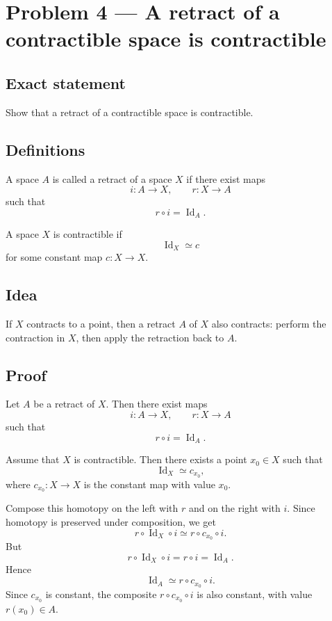 \documentclass[12pt,a4paper]{article}
\theoremstyle{notespace}
\begin{document}
\section{Problem 4 --- A retract of a contractible space is contractible}

\subsection{Exact statement}

Show that a retract of a contractible space is contractible.

\subsection{Definitions}

A space \(A\) is called a retract of a space \(X\) if there exist maps
\[
i:A\to X,
\qquad
r:X\to A
\]
such that
\[
r\circ i = \operatorname{Id}_A.
\]

A space \(X\) is contractible if
\[
\operatorname{Id}_X \simeq c
\]
for some constant map \(c:X\to X\).

\subsection{Idea}

If \(X\) contracts to a point, then a retract \(A\) of \(X\) also contracts: perform the contraction in \(X\), then apply the retraction back to \(A\).

\subsection{Proof}

Let \(A\) be a retract of \(X\). Then there exist maps
\[
i:A\to X,
\qquad
r:X\to A
\]
such that
\[
r\circ i = \operatorname{Id}_A.
\]

Assume that \(X\) is contractible. Then there exists a point \(x_0\in X\) such that
\[
\operatorname{Id}_X \simeq c_{x_0},
\]
where \(c_{x_0}:X\to X\) is the constant map with value \(x_0\).

Compose this homotopy on the left with \(r\) and on the right with \(i\). Since homotopy is preserved under composition, we get
\[
r\circ \operatorname{Id}_X \circ i \simeq r\circ c_{x_0}\circ i.
\]
But
\[
r\circ \operatorname{Id}_X \circ i = r\circ i = \operatorname{Id}_A.
\]
Hence
\[
\operatorname{Id}_A \simeq r\circ c_{x_0}\circ i.
\]
Since \(c_{x_0}\) is constant, the composite \(r\circ c_{x_0}\circ i\) is also constant, with value \(r(x_0)\in A\).
\end{document}
